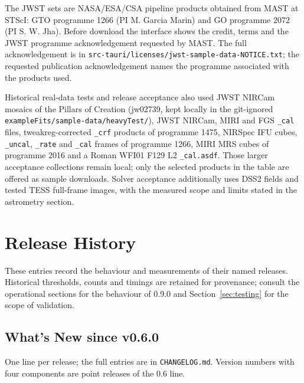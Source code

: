 \documentclass[11pt,a4paper]{article}
\newcommand{\code}[1]{\texttt{\small #1}}
\begin{document}
    The JWST sets are NASA/ESA/CSA pipeline products obtained from MAST at STScI: GTO programme 1266 (PI M. Garcia Marin) and GO programme 2072 (PI S. W. Jha). Before download the interface shows the credit, terms and the JWST programme acknowledgement requested by MAST. The full acknowledgement is in \code{src-tauri/licenses/jwst-sample-data-NOTICE.txt}; the requested publication acknowledgement names the programme associated with the products used.

    Historical real-data tests and release acceptance also used JWST NIRCam mosaics of the Pillars of Creation (jw02739, kept locally in the git-ignored \code{exampleFits/\allowbreak sample-data/\allowbreak heavyTest/}), JWST NIRCam, MIRI and FGS \code{\_cal} files, tweakreg-corrected \code{\_crf} products of programme 1475, NIRSpec IFU cubes, \code{\_uncal}, \code{\_rate} and \code{\_cal} frames of programme 1266, MIRI MRS cubes of programme 2016 and a Roman WFI01 F129 L2 \code{\_cal.asdf}. Those larger acceptance collections remain local; only the selected products in the table are offered as sample downloads. Solver acceptance additionally uses DSS2 fields and tested TESS full-frame images, with the measured scope and limits stated in the astrometry section.


    \clearpage
    \section{Release History}
    \label{sec:release_history}

    These entries record the behaviour and measurements of their named releases. Historical thresholds, counts and timings are retained for provenance; consult the operational sections for the behaviour of 0.9.0 and Section~\ref{sec:testing} for the scope of validation.

    \subsection{What's New since v0.6.0}
    \label{sec:new_since_060}

    One line per release; the full entries are in \code{CHANGELOG.md}. Version numbers with four components are point releases of the 0.6 line.
\end{document}
